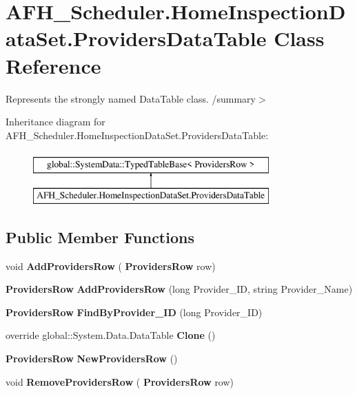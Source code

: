 \section{A\+F\+H\+\_\+\+Scheduler.\+Home\+Inspection\+Data\+Set.\+Providers\+Data\+Table Class Reference}
\label{class_a_f_h___scheduler_1_1_home_inspection_data_set_1_1_providers_data_table}


Represents the strongly named Data\+Table class. /summary$>$  


Inheritance diagram for A\+F\+H\+\_\+\+Scheduler.\+Home\+Inspection\+Data\+Set.\+Providers\+Data\+Table\+:\begin{figure}[H]
\begin{center}
\leavevmode
\includegraphics[height=2.000000cm]{class_a_f_h___scheduler_1_1_home_inspection_data_set_1_1_providers_data_table}
\end{center}
\end{figure}
\subsection*{Public Member Functions}
\begin{DoxyCompactItemize}
\item 
\mbox{\label{class_a_f_h___scheduler_1_1_home_inspection_data_set_1_1_providers_data_table_a4cdb7adf2765a4511bcf0f3b1d489086}} 
void {\bfseries Add\+Providers\+Row} (\textbf{ Providers\+Row} row)
\item 
\mbox{\label{class_a_f_h___scheduler_1_1_home_inspection_data_set_1_1_providers_data_table_a434232b72d04fd4749c06f7ab0a6a8bf}} 
\textbf{ Providers\+Row} {\bfseries Add\+Providers\+Row} (long Provider\+\_\+\+ID, string Provider\+\_\+\+Name)
\item 
\mbox{\label{class_a_f_h___scheduler_1_1_home_inspection_data_set_1_1_providers_data_table_abaa472c10aea14505eae9203e0fe214b}} 
\textbf{ Providers\+Row} {\bfseries Find\+By\+Provider\+\_\+\+ID} (long Provider\+\_\+\+ID)
\item 
\mbox{\label{class_a_f_h___scheduler_1_1_home_inspection_data_set_1_1_providers_data_table_a9a9d4255d0305a641366a3c10ba54c80}} 
override global\+::\+System.\+Data.\+Data\+Table {\bfseries Clone} ()
\item 
\mbox{\label{class_a_f_h___scheduler_1_1_home_inspection_data_set_1_1_providers_data_table_a7cf3355f0437ea8a8935c1021e82bfc3}} 
\textbf{ Providers\+Row} {\bfseries New\+Providers\+Row} ()
\item 
\mbox{\label{class_a_f_h___scheduler_1_1_home_inspection_data_set_1_1_providers_data_table_ac6112a6c0db010da9b0ea19b3dcf8dcd}} 
void {\bfseries Remove\+Providers\+Row} (\textbf{ Providers\+Row} row)
\end{DoxyCompactItemize}
